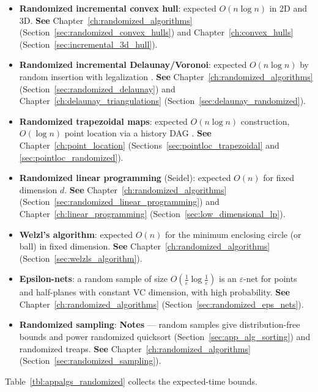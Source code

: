 \begin{itemize}
  \item \textbf{Randomized incremental convex hull}: expected $O(n\log n)$
    in 2D and 3D. \textbf{See} Chapter~\ref{ch:randomized_algorithms}
    (Section~\ref{sec:randomized_convex_hulls}) and
    Chapter~\ref{ch:convex_hulls} (Section~\ref{sec:incremental_3d_hull}).
  \item \textbf{Randomized incremental Delaunay/Voronoi}:
    expected $O(n\log n)$ by random insertion with legalization
    \cite{guibas1992}. \textbf{See} Chapter~\ref{ch:randomized_algorithms}
    (Section~\ref{sec:randomized_delaunay}) and
    Chapter~\ref{ch:delaunay_triangulations} (Section~\ref{sec:delaunay_randomized}).
  \item \textbf{Randomized trapezoidal maps}: expected $O(n\log n)$
    construction, $O(\log n)$ point location via a history DAG
    \cite{seidel1991}. \textbf{See} Chapter~\ref{ch:point_location}
    (Sections~\ref{sec:pointloc_trapezoidal} and \ref{sec:pointloc_randomized}).
  \item \textbf{Randomized linear programming}
    (Seidel): expected $O(n)$ for fixed dimension $d$. \textbf{See}
    Chapter~\ref{ch:randomized_algorithms}
    (Section~\ref{sec:randomized_linear_programming}) and
    Chapter~\ref{ch:linear_programming} (Section~\ref{sec:low_dimensional_lp}).
  \item \textbf{Welzl's algorithm}:
    expected $O(n)$ for the minimum enclosing circle (or ball) in fixed
    dimension. \textbf{See} Chapter~\ref{ch:randomized_algorithms}
    (Section~\ref{sec:welzls_algorithm}).
  \item \textbf{Epsilon-nets}: a random sample of size
    $O(\frac{1}{\varepsilon}\log\frac{1}{\varepsilon})$ is an
    $\varepsilon$-net for points and half-planes with constant VC
    dimension, with high probability. \textbf{See}
    Chapter~\ref{ch:randomized_algorithms} (Section~\ref{sec:randomized_eps_nets}).
  \item \textbf{Randomized sampling}:
    \textbf{Notes} --- random samples give distribution-free bounds and
    power randomized quicksort (Section~\ref{sec:app_alg_sorting}) and
    randomized treaps. \textbf{See} Chapter~\ref{ch:randomized_algorithms}
    (Section~\ref{sec:randomized_sampling}).
\end{itemize}

Table~\ref{tbl:appalgs_randomized} collects the expected-time bounds.

